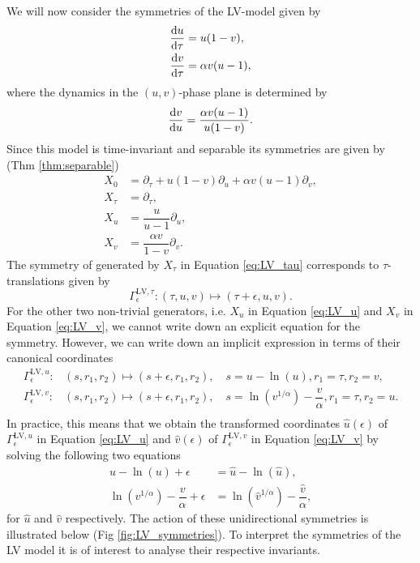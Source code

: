 We will now consider the symmetries of the LV-model \cite{lotka1920undamped,lotka1925elements,volterra1926variations} given by
\begin{equation}
  \begin{split}
    \dv{u}{\tau}&=u(1-v),\\
    \dv{v}{\tau}&=\alpha v(u-1),\\    
    \end{split}
  \label{eq:LV}
\end{equation}
where the dynamics in the $(u,v)$-phase plane is determined by
\begin{equation}
\dv{v}{u}=\dfrac{\alpha v(u-1)}{u(1-v)}.
  \label{eq:LV_phase_plane}
\end{equation}
Since this model is time-invariant and separable its symmetries are given by (Thm \ref{thm:separable})
\begin{align}
  X_0&=\partial_\tau+u(1-v)\partial_u+\alpha v(u-1)\partial_v,\label{eq:LV_0}\\
  X_\tau&=\partial_\tau,\label{eq:LV_tau}\\
  X_u&=\dfrac{u}{u-1}\partial_u,\label{eq:LV_u}\\
  X_v&=\dfrac{\alpha v}{1-v}\partial_v.\label{eq:LV_v}
\end{align}
The symmetry of generated by $X_\tau$ in Equation \eqref{eq:LV_tau} corresponds to $\tau$-translations given by
\begin{equation}
\Gamma^{\mathrm{LV},\tau}_{\epsilon}:(\tau,u,v)\mapsto (\tau+\epsilon,u,v).
\end{equation}
For the other two non-trivial generators, i.e. $X_u$ in Equation \eqref{eq:LV_u} and $X_v$ in Equation \eqref{eq:LV_v}, we cannot write down an explicit equation for the symmetry. However, we can write down an implicit expression in terms of their canonical coordinates
\begin{align}
\Gamma^{\mathrm{LV},u}_{\epsilon}:&(s,r_1,r_2)\mapsto(s+\epsilon,r_1,r_2),\quad s=u-\ln(u),r_1=\tau,r_2=v,\label{eq:LV_u}\\
\Gamma^{\mathrm{LV},v}_{\epsilon}:&(s,r_1,r_2)\mapsto(s+\epsilon,r_1,r_2),\quad s=\ln\left(v^{1/\alpha}\right)-\dfrac{v}{\alpha},r_1=\tau,r_2=u.\label{eq:LV_v}\\
\end{align}
In practice, this means that we obtain the transformed coordinates $\hat{u}(\epsilon)$ of $\Gamma^{\mathrm{LV},u}_{\epsilon}$ in Equation \eqref{eq:LV_u} and $\hat{v}(\epsilon)$ of $\Gamma^{\mathrm{LV},v}_{\epsilon}$ in Equation \eqref{eq:LV_v} by solving the following two equations
\begin{align}
u-\ln(u)+\epsilon&=\hat{u}-\ln(\hat{u}),\label{eq:LV_u_implicit}\\
\ln\left(v^{1/\alpha}\right)-\dfrac{v}{\alpha}+\epsilon&=\ln\left(\hat{v}^{1/\alpha}\right)-\dfrac{\hat{v}}{\alpha},\label{eq:LV_v_implicit}
\end{align}
for $\hat{u}$ and $\hat{v}$ respectively. The action of these unidirectional symmetries is illustrated below (Fig \ref{fig:LV_symmetries}). To interpret the symmetries of the LV model it is of interest to analyse their respective invariants.



